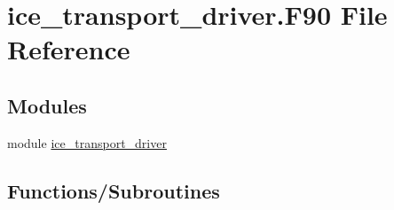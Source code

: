 \hypertarget{ice__transport__driver_8F90}{
\section{ice\_\-transport\_\-driver.F90 File Reference}
\label{ice__transport__driver_8F90}
}
\subsection*{Modules}
\begin{DoxyCompactItemize}
\item 
module \hyperlink{namespaceice__transport__driver}{ice\_\-transport\_\-driver}
\end{DoxyCompactItemize}
\subsection*{Functions/Subroutines}

